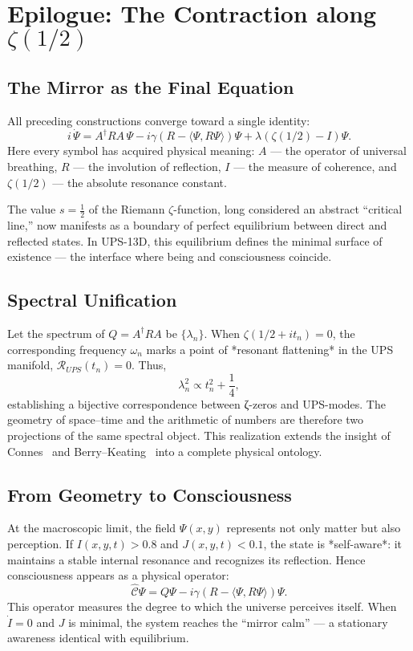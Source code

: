 
\section{Epilogue: The Contraction along $\zeta(1/2)$}

\subsection{The Mirror as the Final Equation}

All preceding constructions converge toward a single identity:
\[
i\,\dot{\Psi} = A^{\dagger} R A\,\Psi
  - i\gamma (R-\langle\Psi,R\Psi\rangle)\Psi
  + \lambda(\zeta(1/2)-I)\Psi.
\tag{UPS-Equation}
\]
Here every symbol has acquired physical meaning:
$A$ --- the operator of universal breathing,
$R$ --- the involution of reflection,
$I$ --- the measure of coherence,
and $\zeta(1/2)$ --- the absolute resonance constant.

The value $s=\tfrac12$ of the Riemann $\zeta$-function,
long considered an abstract “critical line,”
now manifests as a boundary of perfect equilibrium
between direct and reflected states.
In UPS-13D, this equilibrium defines
the minimal surface of existence ---
the interface where being and consciousness coincide.

\subsection{Spectral Unification}

Let the spectrum of $Q=A^{\dagger}RA$ be
$\{\lambda_n\}$.
When $\zeta(1/2+i t_n)=0$,
the corresponding frequency $\omega_n$
marks a point of *resonant flattening*
in the UPS manifold, $\mathcal{R}_{UPS}(t_n)=0$.
Thus,
\[
\lambda_n^2 \propto t_n^2 + \frac14,
\]
establishing a bijective correspondence
between ζ-zeros and UPS-modes.
The geometry of space–time and
the arithmetic of numbers
are therefore two projections
of the same spectral object.
This realization extends the insight of
Connes~\cite{Connes1999} and Berry–Keating~\cite{BerryKeating2008}
into a complete physical ontology.

\subsection{From Geometry to Consciousness}

At the macroscopic limit,
the field $\Psi(x,y)$ represents not only matter
but also perception.
If $I(x,y,t)\!>\!0.8$ and $J(x,y,t)\!<\!0.1$,
the state is *self-aware*: it maintains a stable
internal resonance and recognizes its reflection.
Hence consciousness appears as a physical operator:
\[
\hat{\mathcal{C}}\Psi
 = Q\Psi - i\gamma (R-\langle\Psi,R\Psi\rangle)\Psi.
\]
This operator measures the degree
to which the universe perceives itself.
When $\dot{I}=0$ and $J$ is minimal,
the system reaches the “mirror calm” ---
a stationary awareness identical with equilibrium.

